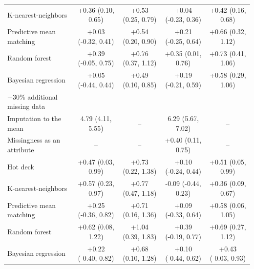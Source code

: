 \documentclass{article}
\begin{document}
\begin{table}
\begin{tabular}{lcccc}
K-nearest-neighbors & +0.36 (0.10, 0.65) & +0.53 (0.25, 0.79) & +0.04 (-0.23, 0.36) & +0.42 (0.16, 0.68) \\ 
Predictive mean matching & +0.03 (-0.32, 0.41) & +0.54 (0.20, 0.90) & +0.21 (-0.25, 0.64) & +0.66 (0.32, 1.12) \\ 
Random forest & +0.39 (-0.05, 0.75) & +0.76 (0.37, 1.12) & +0.35 (0.01, 0.76) & +0.73 (0.41, 1.06) \\ 
Bayesian regression & +0.05 (-0.44, 0.44) & +0.49 (0.10, 0.85) & +0.19 (-0.21, 0.59) & +0.58 (0.29, 1.06) \\ 
\midrule
\multicolumn{1}{l}{+30\% additional missing data} \\ 
\midrule
Imputation to the mean & 4.79 (4.11, 5.55) & -- & 6.29 (5.67, 7.02) & -- \\ 
Missingness as an attribute & -- & -- & +0.40 (0.11, 0.75) & -- \\ 
Hot deck & +0.47 (0.03, 0.99) & +0.73 (0.22, 1.38) & +0.10 (-0.24, 0.44) & +0.51 (0.05, 0.99) \\ 
K-nearest-neighbors & +0.57 (0.23, 0.97) & +0.77 (0.47, 1.18) & -0.09 (-0.44, 0.23) & +0.36 (0.09, 0.67) \\ 
Predictive mean matching & +0.25 (-0.36, 0.82) & +0.71 (0.16, 1.36) & +0.09 (-0.33, 0.64) & +0.58 (0.06, 1.05) \\ 
Random forest & +0.62 (0.08, 1.22) & +1.04 (0.39, 1.83) & +0.39 (-0.19, 0.77) & +0.69 (0.27, 1.12) \\ 
Bayesian regression & +0.22 (-0.40, 0.82) & +0.68 (0.10, 1.28) & +0.10 (-0.44, 0.62) & +0.43 (-0.03, 0.93) \\ 
\bottomrule
\end{tabular} 
 \end{table}

\clearpage
\end{document}
